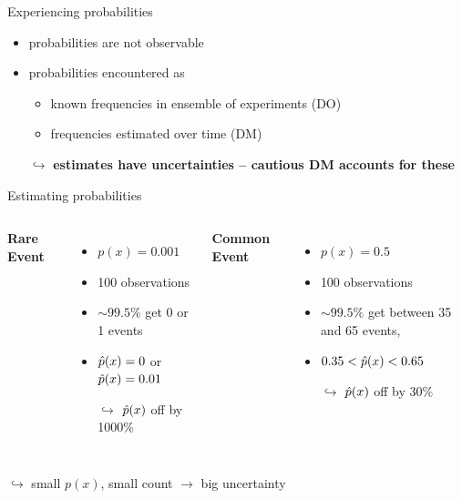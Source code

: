 \begin{frame}{Experiencing probabilities}

\begin{itemize}
  \item probabilities are not observable
  \item probabilities encountered as
  	\begin{itemize}
  		\item known frequencies in ensemble of experiments (DO)
  		\item frequencies estimated over time (DM)
  	\end{itemize}
  \item[$\hookrightarrow$] \textbf{estimates have uncertainties -- cautious DM accounts for these}

\end{itemize}
\end{frame}


\begin{frame}{Estimating probabilities}
\begin{columns}[T]
\textbf{Rare Event} %
\begin{itemize}
  \item $p(x) = 0.001$
  \item \num{100} observations
  \item $\sim 99.5\%$ get 0 or 1 events
  \item $\hat{p}(x) = 0$ or $\hat{p}(x)=0.01$
  \item[$\hookrightarrow$] $\hat{p}(x)$ off by \num{1000}\% 
\end{itemize}
\textbf{Common Event} %
\begin{itemize}
  \item $p(x)=0.5$
  \item \num{100} observations
  \item $\sim 99.5\%$ get between 35 and 65 events,
  \item $0.35< \hat{p}(x) <0.65$
  \item[$\hookrightarrow$] $\hat{p}(x)$ off by 30\%
\end{itemize}
\end{columns}
\vspace{2em}
 \centering
$\hookrightarrow$ small $p(x)$, small count $\rightarrow$ big uncertainty
\end{frame}


